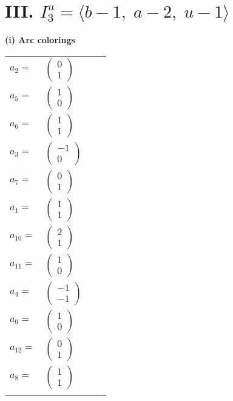 \documentclass[1p]{elsarticle_modified}
\theoremstyle{definition}
\begin{document}
\centering \section*{III. $I^u_{3}= \langle b-1,\;a-2,\;u-1 \rangle$}
\flushleft \textbf{(i) Arc colorings}\\
\begin{tabular}{m{7pt} m{180pt} m{7pt} m{180pt} }
\flushright $a_{2}=$&$\begin{pmatrix}0\\1\end{pmatrix}$ \\
\flushright $a_{5}=$&$\begin{pmatrix}1\\0\end{pmatrix}$ \\
\flushright $a_{6}=$&$\begin{pmatrix}1\\1\end{pmatrix}$ \\
\flushright $a_{3}=$&$\begin{pmatrix}-1\\0\end{pmatrix}$ \\
\flushright $a_{7}=$&$\begin{pmatrix}0\\1\end{pmatrix}$ \\
\flushright $a_{1}=$&$\begin{pmatrix}1\\1\end{pmatrix}$ \\
\flushright $a_{10}=$&$\begin{pmatrix}2\\1\end{pmatrix}$ \\
\flushright $a_{11}=$&$\begin{pmatrix}1\\0\end{pmatrix}$ \\
\flushright $a_{4}=$&$\begin{pmatrix}-1\\-1\end{pmatrix}$ \\
\flushright $a_{9}=$&$\begin{pmatrix}1\\0\end{pmatrix}$ \\
\flushright $a_{12}=$&$\begin{pmatrix}0\\1\end{pmatrix}$ \\
\flushright $a_{8}=$&$\begin{pmatrix}1\\1\end{pmatrix}$\\&\end{tabular}
\end{document}
